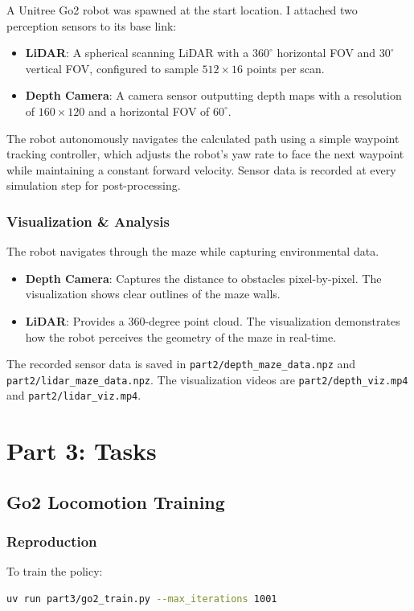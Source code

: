 \documentclass[UTF8]{ctexart}
\begin{document}
A Unitree Go2 robot was spawned at the start location. I attached two perception sensors to its base link:
\begin{itemize}
    \item \textbf{LiDAR}: A spherical scanning LiDAR with a $360^\circ$ horizontal FOV and $30^\circ$ vertical FOV, configured to sample $512 \times 16$ points per scan.
    \item \textbf{Depth Camera}: A camera sensor outputting depth maps with a resolution of $160 \times 120$ and a horizontal FOV of $60^\circ$.
\end{itemize}

The robot autonomously navigates the calculated path using a simple waypoint tracking controller, which adjusts the robot's yaw rate to face the next waypoint while maintaining a constant forward velocity. Sensor data is recorded at every simulation step for post-processing.

\subsubsection{Visualization \& Analysis}
The robot navigates through the maze while capturing environmental data.
\begin{itemize}
    \item \textbf{Depth Camera}: Captures the distance to obstacles pixel-by-pixel. The visualization shows clear outlines of the maze walls.
    \item \textbf{LiDAR}: Provides a 360-degree point cloud. The visualization demonstrates how the robot perceives the geometry of the maze in real-time.
\end{itemize}

The recorded sensor data is saved in \texttt{part2/depth\_maze\_data.npz} and \texttt{part2/lidar\_maze\_data.npz}.
The visualization videos are \texttt{part2/depth\_viz.mp4} and \texttt{part2/lidar\_viz.mp4}.

\section{Part 3: Tasks}

\subsection{Go2 Locomotion Training}
\subsubsection{Reproduction}
To train the policy:
\begin{lstlisting}[language=bash,xleftmargin=2em]
uv run part3/go2_train.py --max_iterations 1001
\end{lstlisting}
\end{document}
